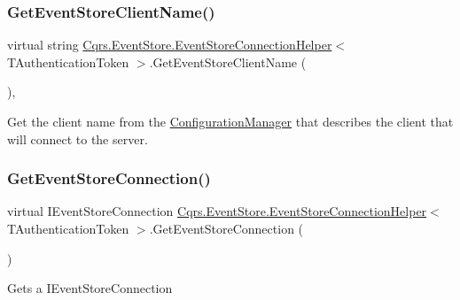 \subsubsection{\texorpdfstring{Get\+Event\+Store\+Client\+Name()}{GetEventStoreClientName()}}
{\footnotesize\ttfamily virtual string \hyperlink{classCqrs_1_1EventStore_1_1EventStoreConnectionHelper}{Cqrs.\+Event\+Store.\+Event\+Store\+Connection\+Helper}$<$ T\+Authentication\+Token $>$.Get\+Event\+Store\+Client\+Name (\begin{DoxyParamCaption}{ }\end{DoxyParamCaption})\hspace{0.3cm}{\ttfamily [protected]}, {\ttfamily [virtual]}}



Get the client name from the \hyperlink{classCqrs_1_1EventStore_1_1EventStoreConnectionHelper_aa518bbaa1cd7d75a57429c3cf4dd4f96_aa518bbaa1cd7d75a57429c3cf4dd4f96}{Configuration\+Manager} that describes the client that will connect to the server. 

\mbox{\label{classCqrs_1_1EventStore_1_1EventStoreConnectionHelper_a36c7ef0505319af9f8ae02da0050ab30_a36c7ef0505319af9f8ae02da0050ab30}} 
\subsubsection{\texorpdfstring{Get\+Event\+Store\+Connection()}{GetEventStoreConnection()}}
{\footnotesize\ttfamily virtual I\+Event\+Store\+Connection \hyperlink{classCqrs_1_1EventStore_1_1EventStoreConnectionHelper}{Cqrs.\+Event\+Store.\+Event\+Store\+Connection\+Helper}$<$ T\+Authentication\+Token $>$.Get\+Event\+Store\+Connection (\begin{DoxyParamCaption}{ }\end{DoxyParamCaption})\hspace{0.3cm}{\ttfamily [virtual]}}



Gets a I\+Event\+Store\+Connection 



